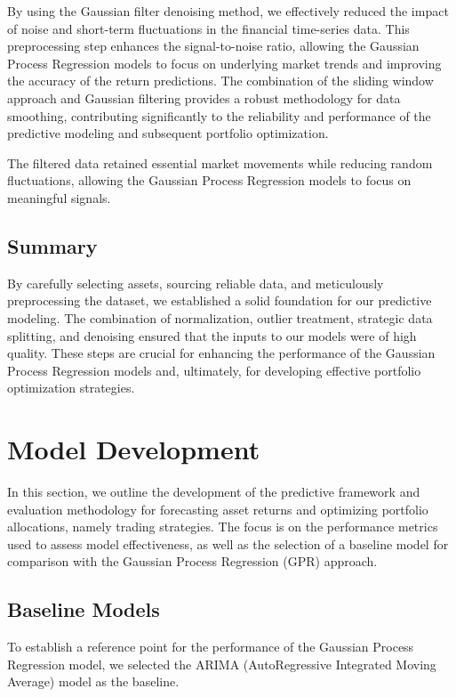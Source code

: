 By using the Gaussian filter denoising method, we effectively reduced the impact of noise and short-term fluctuations in the financial time-series data. This preprocessing step enhances the signal-to-noise ratio, allowing the Gaussian Process Regression models to focus on underlying market trends and improving the accuracy of the return predictions. The combination of the sliding window approach and Gaussian filtering provides a robust methodology for data smoothing, contributing significantly to the reliability and performance of the predictive modeling and subsequent portfolio optimization.

The filtered data retained essential market movements while reducing random fluctuations, allowing the Gaussian Process Regression models to focus on meaningful signals.


\subsection{Summary}

By carefully selecting assets, sourcing reliable data, and meticulously preprocessing the dataset, we established a solid foundation for our predictive modeling. The combination of normalization, outlier treatment, strategic data splitting, and denoising ensured that the inputs to our models were of high quality. These steps are crucial for enhancing the performance of the Gaussian Process Regression models and, ultimately, for developing effective portfolio optimization strategies.



\section{Model Development}
In this section, we outline the development of the predictive framework and evaluation methodology for forecasting asset returns and optimizing portfolio allocations, namely trading strategies. The focus is on the performance metrics used to assess model effectiveness, as well as the selection of a baseline model for comparison with the Gaussian Process Regression (GPR) approach.

\subsection{Baseline Models}

To establish a reference point for the performance of the Gaussian Process Regression model, we selected the ARIMA (AutoRegressive Integrated Moving Average) model as the baseline.

